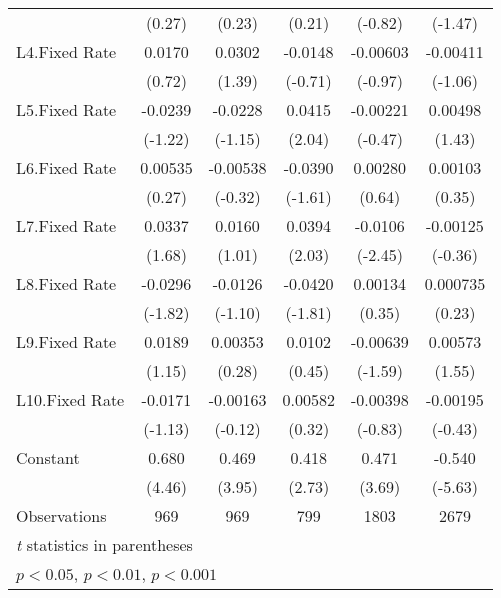 {\begin{longtable}{l*{5}{c}}
                &   (0.27)         &   (0.23)         &   (0.21)         &  (-0.82)         &  (-1.47)         \\
[1em]
L4.Fixed Rate   &   0.0170         &   0.0302         &  -0.0148         & -0.00603         & -0.00411         \\
                &   (0.72)         &   (1.39)         &  (-0.71)         &  (-0.97)         &  (-1.06)         \\
[1em]
L5.Fixed Rate   &  -0.0239         &  -0.0228         &   0.0415\sym{*}  & -0.00221         &  0.00498         \\
                &  (-1.22)         &  (-1.15)         &   (2.04)         &  (-0.47)         &   (1.43)         \\
[1em]
L6.Fixed Rate   &  0.00535         & -0.00538         &  -0.0390         &  0.00280         &  0.00103         \\
                &   (0.27)         &  (-0.32)         &  (-1.61)         &   (0.64)         &   (0.35)         \\
[1em]
L7.Fixed Rate   &   0.0337         &   0.0160         &   0.0394\sym{*}  &  -0.0106\sym{*}  & -0.00125         \\
                &   (1.68)         &   (1.01)         &   (2.03)         &  (-2.45)         &  (-0.36)         \\
[1em]
L8.Fixed Rate   &  -0.0296         &  -0.0126         &  -0.0420         &  0.00134         & 0.000735         \\
                &  (-1.82)         &  (-1.10)         &  (-1.81)         &   (0.35)         &   (0.23)         \\
[1em]
L9.Fixed Rate   &   0.0189         &  0.00353         &   0.0102         & -0.00639         &  0.00573         \\
                &   (1.15)         &   (0.28)         &   (0.45)         &  (-1.59)         &   (1.55)         \\
[1em]
L10.Fixed Rate  &  -0.0171         & -0.00163         &  0.00582         & -0.00398         & -0.00195         \\
                &  (-1.13)         &  (-0.12)         &   (0.32)         &  (-0.83)         &  (-0.43)         \\
[1em]
Constant        &    0.680\sym{***}&    0.469\sym{***}&    0.418\sym{**} &    0.471\sym{***}&   -0.540\sym{***}\\
                &   (4.46)         &   (3.95)         &   (2.73)         &   (3.69)         &  (-5.63)         \\
\hline
Observations    &      969         &      969         &      799         &     1803         &     2679         \\
\hline\hline
\multicolumn{6}{l}{\footnotesize \textit{t} statistics in parentheses}\\
\multicolumn{6}{l}{\footnotesize \sym{*} \(p<0.05\), \sym{**} \(p<0.01\), \sym{***} \(p<0.001\)}\\
\end{longtable}
}

